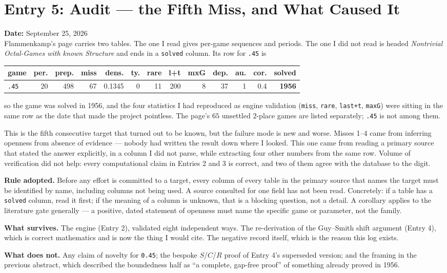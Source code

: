 \documentclass[12pt]{article}
\begin{document}
\section*{Entry 5: Audit --- the Fifth Miss, and What Caused It}
\textbf{Date:} September 25, 2026 \\
Flammenkamp's page carries two tables. The one I read gives per-game
sequences and periods. The one I did not read is headed \emph{Nontrivial
Octal-Games with known Structure} and ends in a \texttt{solved} column. Its
row for \texttt{.45} is
\begin{center}\footnotesize\setlength{\tabcolsep}{3.5pt}
\begin{tabular}{lrrrrrrrrrrrr}
\toprule
game & per. & prep. & miss & dens. & ty. & rare & l+t & mxG & dep. & au. & cor. & \textbf{solved} \\
\midrule
\texttt{.45} & 20 & 498 & 67 & 0.1345 & 0 & 11 & 200 & 8 & 37 & 1 & 0.4 & \textbf{1956} \\
\bottomrule
\end{tabular}
\end{center}
so the game was solved in 1956, and the four statistics I had reproduced as
engine validation (\texttt{miss}, \texttt{rare}, \texttt{last+t},
\texttt{maxG}) were sitting in the same row as the date that made the project
pointless. The page's $65$ unsettled $2$-place games are listed separately;
\texttt{.45} is not among them.

This is the fifth consecutive target that turned out to be known, but the
failure mode is new and worse. Misses 1--4 came from inferring openness from
absence of evidence --- nobody had written the result down where I looked. This
one came from reading a primary source that stated the answer explicitly, in a
column I did not parse, while extracting four other numbers from the same
row. Volume of verification did not help: every computational claim in
Entries 2 and 3 is correct, and two of them agree with the database to the
digit.

\textbf{Rule adopted.} Before any effort is committed to a target, every
column of every table in the primary source that names the target must be
identified by name, including columns not being used. A source consulted for
one field has not been read. Concretely: if a table has a \texttt{solved}
column, read it first; if the meaning of a column is unknown, that is a
blocking question, not a detail. A corollary applies to the literature gate
generally --- a positive, dated statement of openness must name the specific
game or parameter, not the family.

\textbf{What survives.} The engine (Entry 2), validated eight independent
ways. The re-derivation of the Guy--Smith shift argument (Entry 4), which is
correct mathematics and is now the thing I would cite. The negative record
itself, which is the reason this log exists.

\textbf{What does not.} Any claim of novelty for \texttt{0.45}; the bespoke
$S$/$C$/$R$ proof of Entry 4's superseded version; and the framing in the
previous abstract, which described the boundedness half as ``a complete,
gap-free proof'' of something already proved in 1956.
\end{document}
